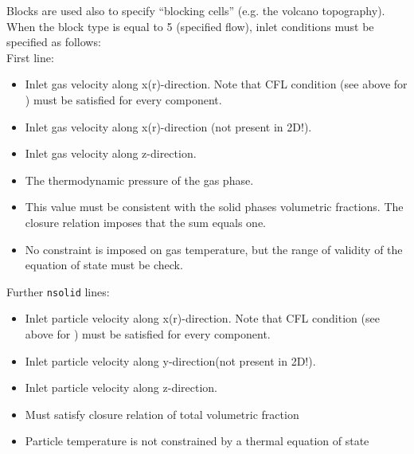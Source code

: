 Blocks are used also to specify ``blocking cells'' (e.g. 
the volcano topography). When the block type is equal to 5 (specified
flow), inlet conditions must be specified as follows:\\

First line:

\begin{itemize}
\item
{}
{Inlet gas velocity along x(r)-direction. Note that CFL condition (see above for ) 
must be satisfied for every component.}

\item
{}
{Inlet gas velocity along x(r)-direction (not present in 2D!).}

\item
{}
{Inlet gas velocity along z-direction.}

\item
{}
{The thermodynamic pressure of the gas phase.}

\item
{}
{This value must be consistent with the solid phases volumetric fractions.
The closure relation imposes that the sum equals one.}

\item
{}
{No constraint is imposed on gas temperature, but the range of validity
of the equation of state must be check.}
\end{itemize}

Further {\tt nsolid} lines:
\begin{itemize}
\item
{}
{Inlet particle velocity along x(r)-direction.
Note that CFL condition (see above for ) 
must be satisfied for every component.}

\item
{}
{Inlet particle velocity along y-direction(not present in 2D!).}

\item
{}
{Inlet particle velocity along z-direction.}

\item
{}
{Must satisfy closure relation of total volumetric fraction}

\item
{}
{Particle temperature is not constrained by a thermal equation of state}

\end{itemize}

